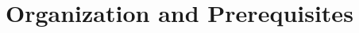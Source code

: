 \documentclass[../Moduli_Spaces_of_Riemann_Surfaces.tex]{subfiles}
\begin{document}
    \section{Organization and Prerequisites}
\end{document}
